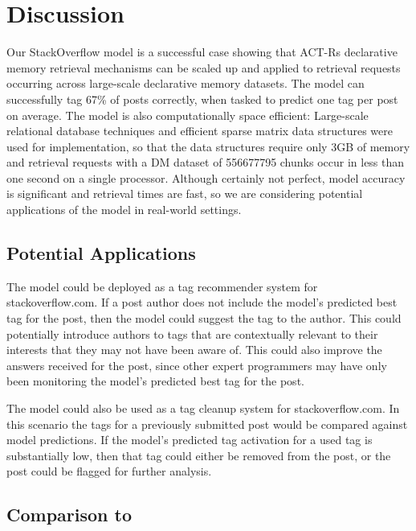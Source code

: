 \documentclass[10pt,letterpaper]{article}
\begin{document}
\section{Discussion}

Our StackOverflow model is a successful case showing that ACT-Rs declarative memory retrieval mechanisms can be scaled up and applied to retrieval requests occurring across large-scale declarative memory datasets. 
The model can successfully tag 67\% of posts correctly, when tasked to predict one tag per post on average.
The model is also computationally space efficient:
Large-scale relational database techniques and efficient sparse matrix data structures were used for implementation,
so that the data structures require only 3GB of memory and retrieval requests with a DM dataset of \num{556677795} chunks occur in less than one second on a single processor.
Although certainly not perfect, model accuracy is significant and retrieval times are fast, so we are considering potential applications of the model in real-world settings.

\subsection{Potential Applications}

The model could be deployed as a tag recommender system for stackoverflow.com. 
If a post author does not include the model's predicted best tag for the post, then the model could suggest the tag to the author.
This could potentially introduce authors to tags that are contextually relevant to their interests that they may not have been aware of.
This could also improve the answers received for the post, since other expert programmers may have only been monitoring the model's predicted best tag for the post.

The model could also be used as a tag cleanup system for stackoverflow.com.
In this scenario the tags for a previously submitted post would be compared against model predictions.
If the model's predicted tag activation for a used tag is substantially low, then that tag could either be removed from the post, or the post could be flagged for further analysis.

\subsection{Comparison to }
\end{document}
